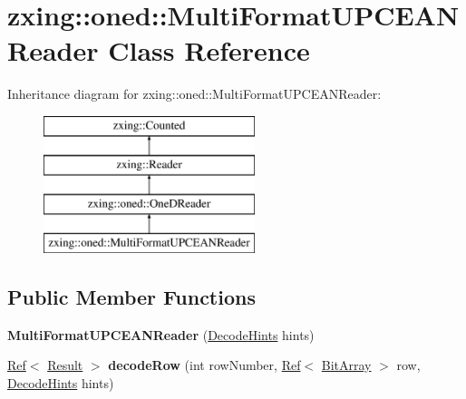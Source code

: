 \hypertarget{classzxing_1_1oned_1_1_multi_format_u_p_c_e_a_n_reader}{}\section{zxing\+:\+:oned\+:\+:Multi\+Format\+U\+P\+C\+E\+A\+N\+Reader Class Reference}
\label{classzxing_1_1oned_1_1_multi_format_u_p_c_e_a_n_reader}
Inheritance diagram for zxing\+:\+:oned\+:\+:Multi\+Format\+U\+P\+C\+E\+A\+N\+Reader\+:\begin{figure}[H]
\begin{center}
\leavevmode
\includegraphics[height=4.000000cm]{classzxing_1_1oned_1_1_multi_format_u_p_c_e_a_n_reader}
\end{center}
\end{figure}
\subsection*{Public Member Functions}
\begin{DoxyCompactItemize}
\item 
\mbox{\label{classzxing_1_1oned_1_1_multi_format_u_p_c_e_a_n_reader_a204aae54def61ae638e6a5ba1e76589a}} 
{\bfseries Multi\+Format\+U\+P\+C\+E\+A\+N\+Reader} (\mbox{\hyperlink{classzxing_1_1_decode_hints}{Decode\+Hints}} hints)
\item 
\mbox{\label{classzxing_1_1oned_1_1_multi_format_u_p_c_e_a_n_reader_a5521b1e13b24851b3467d81a4d1506f1}} 
\mbox{\hyperlink{classzxing_1_1_ref}{Ref}}$<$ \mbox{\hyperlink{classzxing_1_1_result}{Result}} $>$ {\bfseries decode\+Row} (int row\+Number, \mbox{\hyperlink{classzxing_1_1_ref}{Ref}}$<$ \mbox{\hyperlink{classzxing_1_1_bit_array}{Bit\+Array}} $>$ row, \mbox{\hyperlink{classzxing_1_1_decode_hints}{Decode\+Hints}} hints)
\end{DoxyCompactItemize}
